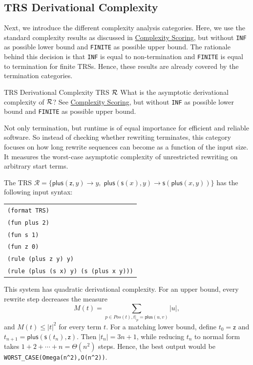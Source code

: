 \subsection{TRS Derivational Complexity}

Next, we introduce the different complexity analysis categories.
Here, we use the standard complexity results as discussed in \hyperref[scoring_complexity]{Complexity Scoring}, but without \texttt{INF} as possible lower bound and \texttt{FINITE} as possible upper bound.
The rationale behind this decision is that \texttt{INF} is equal to non-termination
and \texttt{FINITE} is equal to termination for finite TRSs.
Hence, these results are already covered by the termination categories.

\begin{formalproblem}
  {TRS Derivational Complexity}
  {TRS $\mathcal{R}$}
  {What is the asymptotic derivational complexity of $\mathcal{R}$?}
  {See \hyperref[scoring_complexity]{Complexity Scoring}, but without \texttt{INF} as possible lower bound and \texttt{FINITE} as possible upper bound.}
\end{formalproblem}

\begin{motivation}
Not only termination, but runtime is of equal importance for efficient and reliable software.
So instead of checking whether rewriting terminates,
this category focuses on how long rewrite sequences can become as a function of the input size.
It measures the worst-case asymptotic complexity of unrestricted rewriting on arbitrary start terms.
\end{motivation}

\begin{example}
The TRS $\mathcal{R} = \{\mathsf{plus}(\mathsf{z}, y) \to y,\; 
\mathsf{plus}(\mathsf{s}(x), y) \to \mathsf{s}(\mathsf{plus}(x,y))\}$ has the following input syntax:
\begin{center}
\begin{tabular}{l}
\texttt{(format TRS)} \\
\texttt{(fun plus 2)} \\
\texttt{(fun s 1)} \\
\texttt{(fun z 0)} \\
\texttt{(rule (plus z y) y)} \\
\texttt{(rule (plus (s x) y) (s (plus x y)))}
\end{tabular}
\end{center}
This system has quadratic derivational complexity. For an upper bound, every rewrite step decreases the measure
\[
  M(t) = \sum_{p \in \mathit{Pos}(t), t|_p = \mathsf{plus}(u,v)}|u|,
\]
and $M(t) \leq |t|^2$ for every term $t$. For a matching lower bound, 
define $t_0 = \mathsf{z}$ and $t_{n+1} = \mathsf{plus}(\mathsf{s}(t_n),\mathsf{z})$. 
Then $|t_n| = 3n+1$, while reducing $t_n$ to normal form takes $1 + 2 + \cdots + n = \Theta(n^2)$ steps. 
Hence, the best output would be \texttt{WORST\_CASE(Omega(n\^{}2),O(n\^{}2))}.
\end{example}

